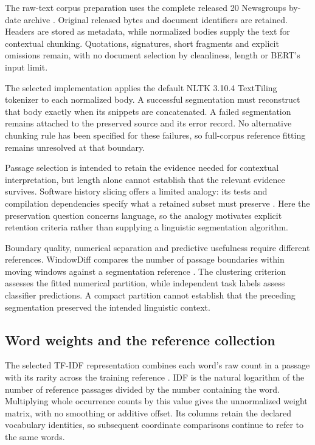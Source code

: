 \documentclass[10pt,letterpaper]{article}
\begin{document}
The raw-text corpus preparation uses the complete released 20 Newsgroups by-date archive \cite{twentynews}. Original released bytes and document identifiers are retained. Headers are stored as metadata, while normalized bodies supply the text for contextual chunking. Quotations, signatures, short fragments and explicit omissions remain, with no document selection by cleanliness, length or BERT's input limit.\par

The selected implementation applies the default NLTK 3.10.4 TextTiling tokenizer to each normalized body. A successful segmentation must reconstruct that body exactly when its snippets are concatenated. A failed segmentation remains attached to the preserved source and its error record. No alternative chunking rule has been specified for these failures, so full-corpus reference fitting remains unresolved at that boundary.\par

Passage selection is intended to retain the evidence needed for contextual interpretation, but length alone cannot establish that the relevant evidence survives. Software history slicing offers a limited analogy: its tests and compilation dependencies specify what a retained subset must preserve \cite{cslicer}. Here the preservation question concerns language, so the analogy motivates explicit retention criteria rather than supplying a linguistic segmentation algorithm.\par

Boundary quality, numerical separation and predictive usefulness require different references. WindowDiff compares the number of passage boundaries within moving windows against a segmentation reference \cite{windowdiff}. The clustering criterion assesses the fitted numerical partition, while independent task labels assess classifier predictions. A compact partition cannot establish that the preceding segmentation preserved the intended linguistic context.\par

\subsection{Word weights and the reference collection}
The selected TF-IDF representation combines each word's raw count in a passage with its rarity across the training reference \cite{sparck,salton,saltonbuckley}. IDF is the natural logarithm of the number of reference passages divided by the number containing the word. Multiplying whole occurrence counts by this value gives the unnormalized weight matrix, with no smoothing or additive offset. Its columns retain the declared vocabulary identities, so subsequent coordinate comparisons continue to refer to the same words.\par
\end{document}
